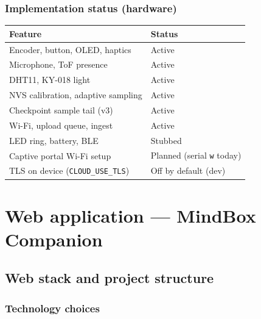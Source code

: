 \documentclass[11pt,a4paper]{report}
\begin{document}
\section{Implementation status (hardware)}

\begin{table}[h]
\centering
\begin{tabular}{@{}ll@{}}
\toprule
\textbf{Feature} & \textbf{Status} \\
\midrule
Encoder, button, OLED, haptics & Active \\
Microphone, ToF presence & Active \\
DHT11, KY-018 light & Active \\
NVS calibration, adaptive sampling & Active \\
Checkpoint sample tail (v3) & Active \\
Wi-Fi, upload queue, ingest & Active \\
LED ring, battery, BLE & Stubbed \\
Captive portal Wi-Fi setup & Planned (serial \texttt{w} today) \\
TLS on device (\texttt{CLOUD\_USE\_TLS}) & Off by default (dev) \\
\bottomrule
\end{tabular}
\end{table}

\part{Web application --- MindBox Companion}

\chapter{Web stack and project structure}

\section{Technology choices}
\end{document}
